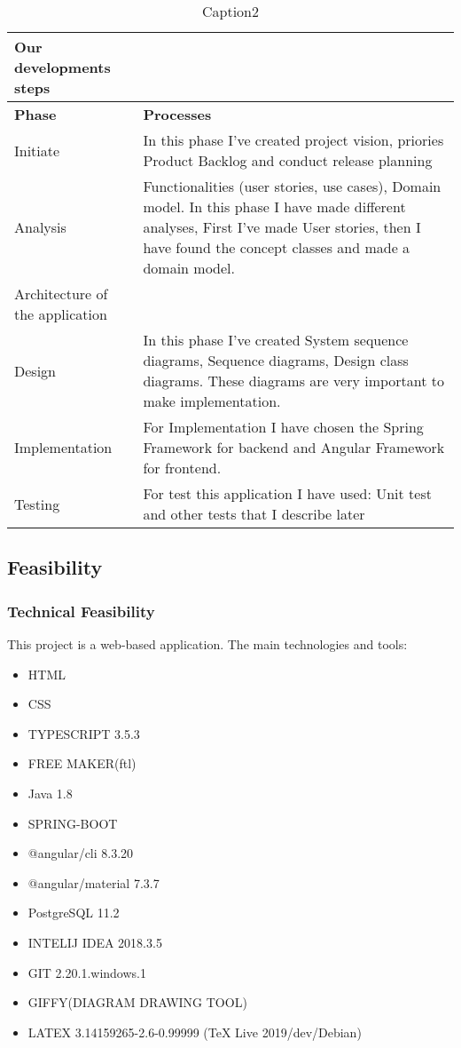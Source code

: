 \documentclass{scrartcl}
\begin{document}
\begin{table}[h]
\begin{center}
\begin{tabular}{| p{7cm}| p{7cm} |}
Our developments steps \\
\hline
\textbf{Phase} & \textbf{Processes} \\
\hline
Initiate                    &             In this phase I've created project vision, priories Product Backlog and conduct release planning \\ \hline
Analysis                    &             Functionalities (user stories, use cases), Domain model. In this phase I have made different analyses, First I've made User stories, then I have found the concept classes and made a domain model.\\ \hline
Architecture of the application                   &           \\ \hline
Design                   &        In this phase I've created  System sequence diagrams, Sequence diagrams, Design class diagrams. These diagrams are very important to make implementation. \\ \hline
Implementation                   &           For Implementation I have chosen the Spring Framework for backend and Angular Framework for frontend.\\ \hline
Testing                   &            For test this application I have used: Unit test and other tests that I describe later\\ \hline

\end{tabular}
\end{center}
\caption{Caption2}
\label{table2}
\end{table}

\subsection{Feasibility}
\subsubsection{Technical Feasibility}
This project is a web-based application. The main technologies and tools:
\begin{itemize}
  	\item HTML
  	\item CSS
  	\item TYPESCRIPT 3.5.3
  	\item FREE MAKER(ftl)
  	\item Java 1.8
  	\item SPRING-BOOT 
  	\item @angular/cli  8.3.20
  	\item @angular/material  7.3.7
  	\item PostgreSQL  11.2
  	\item INTELIJ IDEA  2018.3.5
  	\item GIT  2.20.1.windows.1
  	\item GIFFY(DIAGRAM DRAWING TOOL)
  	\item LATEX 3.14159265-2.6-0.99999 (TeX Live 2019/dev/Debian)

  
  	
  	\end{itemize}
\end{document}

